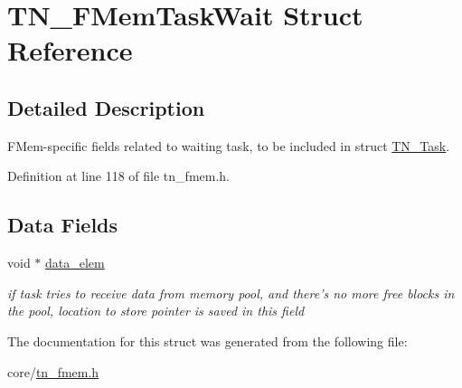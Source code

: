\hypertarget{structTN__FMemTaskWait}{\section{T\+N\+\_\+\+F\+Mem\+Task\+Wait Struct Reference}
\label{structTN__FMemTaskWait}
}


\subsection{Detailed Description}
F\+Mem-\/specific fields related to waiting task, to be included in struct \hyperlink{structTN__Task}{T\+N\+\_\+\+Task}. 

Definition at line 118 of file tn\+\_\+fmem.\+h.

\subsection*{Data Fields}
\begin{DoxyCompactItemize}
\item 
\hypertarget{structTN__FMemTaskWait_a68632560b260859d863fbd3fc24b0506}{void $\ast$ \hyperlink{structTN__FMemTaskWait_a68632560b260859d863fbd3fc24b0506}{data\+\_\+elem}}\label{structTN__FMemTaskWait_a68632560b260859d863fbd3fc24b0506}

\begin{DoxyCompactList}\small\item\em if task tries to receive data from memory pool, and there's no more free blocks in the pool, location to store pointer is saved in this field \end{DoxyCompactList}\end{DoxyCompactItemize}


The documentation for this struct was generated from the following file\+:\begin{DoxyCompactItemize}
\item 
core/\hyperlink{tn__fmem_8h}{tn\+\_\+fmem.\+h}\end{DoxyCompactItemize}
